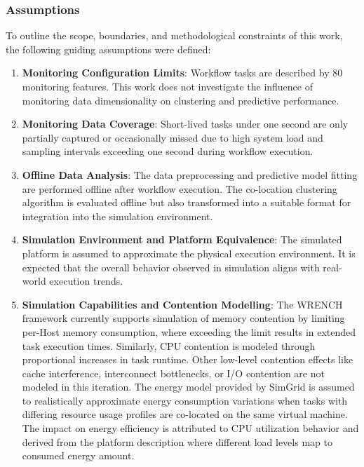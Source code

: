 \subsubsection{Assumptions}
\label{sec:assumptions}
To outline the scope, boundaries, and methodological constraints of this work, the following guiding assumptions were defined:

\begin{enumerate}
    \item \textbf{Monitoring Configuration Limits}:  Workflow tasks are described by 80 monitoring features. This work does not investigate the influence of monitoring data dimensionality on clustering and predictive performance.
    \item \textbf{Monitoring Data Coverage}: Short-lived tasks under one second are only partially captured or occasionally missed due to high system load and sampling intervals exceeding one second during workflow execution.
    \item \textbf{Offline Data Analysis}: The data preprocessing and predictive model fitting are performed offline after workflow execution. The co-location clustering algorithm is evaluated offline but also transformed into a suitable format for integration into the simulation environment.
    \item \textbf{Simulation Environment and Platform Equivalence}: The simulated platform is assumed to approximate the physical execution environment. It is expected that the overall behavior observed in simulation aligns with real-world execution trends.
    \item \textbf{Simulation Capabilities and Contention Modelling}: The WRENCH framework currently supports simulation of memory contention by limiting per-Host memory consumption, where exceeding the limit results in extended task execution times. Similarly, CPU contention is modeled through proportional increases in task runtime. Other low-level contention effects like cache interference, interconnect bottlenecks, or I/O contention are not modeled in this iteration. The energy model provided by SimGrid is assumed to realistically approximate energy consumption variations when tasks with differing resource usage profiles are co-located on the same virtual machine. The impact on energy efficiency is attributed to CPU utilization behavior and derived from the platform description where different load levels map to consumed energy amount.
\end{enumerate}

